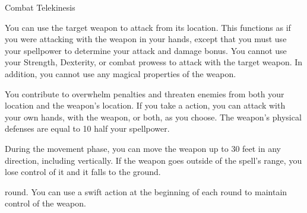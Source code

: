 \begin{spellsection}{Combat Telekinesis}
    \begin{spellheader}
    \end{spellheader}
    \begin{spellcontent}
        \begin{spelltargetinginfo}
            \spellrng{\rngclose}
        \end{spelltargetinginfo}
        \begin{spelleffects}
            \spelleffect You can use the target weapon to attack from its location.
            This functions as if you were attacking with the weapon in your hands, except that you must use your spellpower to determine your attack and damage bonus.
            You cannot use your Strength, Dexterity, or combat prowess to attack with the target weapon.
            In addition, you cannot use any magical properties of the weapon.

            You contribute to overwhelm penalties and threaten enemies from both your location and the weapon's location.
            If you take a  action, you can attack with your own hands, with the weapon, or both, as you choose.
            The weapon's physical defenses are equal to 10 \add half your spellpower.

            During the movement phase, you can move the weapon up to 30 feet in any direction, including vertically.
            If the weapon goes outside of the spell's range, you lose control of it and it falls to the ground.

             round. You can use a swift action at the beginning of each round to maintain control of the weapon.
        \end{spelleffects}
    \end{spellcontent}
    \begin{spellfooter}
    \end{spellfooter}
\end{spellsection}

